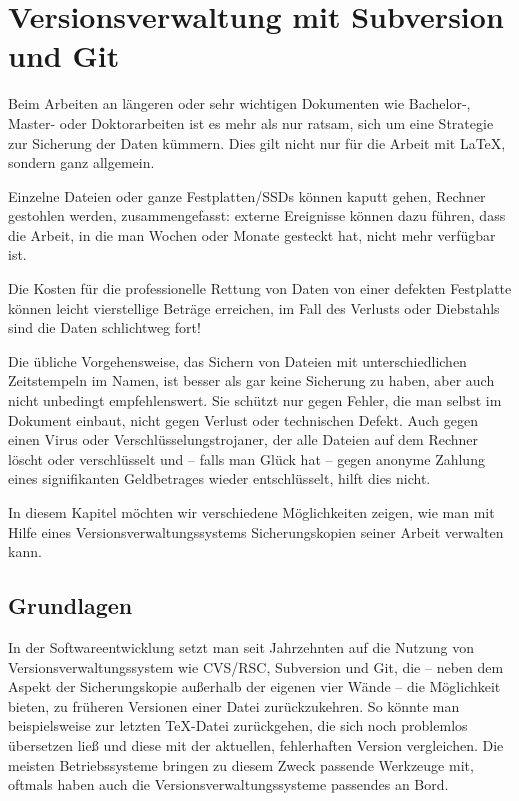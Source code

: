 \chapter{Versionsverwaltung mit Subversion und Git}

Beim Arbeiten an längeren oder sehr wichtigen Dokumenten wie Bachelor-, Master- oder Doktorarbeiten ist es mehr als nur ratsam, sich um eine Strategie zur Sicherung der Daten kümmern. Dies gilt nicht nur für die Arbeit mit \LaTeX, sondern ganz allgemein. 

Einzelne Dateien oder ganze Festplatten/SSDs können kaputt gehen, Rechner gestohlen werden, zusammengefasst: externe Ereignisse können dazu führen, dass die Arbeit, in die man Wochen oder Monate gesteckt hat, nicht mehr verfügbar ist. 

Die Kosten für die professionelle Rettung von Daten von einer defekten Festplatte können leicht vierstellige Beträge erreichen, im Fall des Verlusts oder Diebstahls sind die Daten schlichtweg fort!

Die übliche Vorgehensweise, das Sichern von Dateien mit unterschiedlichen Zeitstempeln im Namen, ist besser als gar keine Sicherung zu haben, aber auch nicht unbedingt empfehlenswert. Sie schützt nur gegen Fehler, die man selbst im Dokument einbaut, nicht gegen Verlust oder technischen Defekt. Auch gegen einen Virus oder Verschlüsselungstrojaner, der alle Dateien auf dem Rechner löscht oder verschlüsselt und -- falls man Glück hat -- gegen anonyme Zahlung eines signifikanten Geldbetrages wieder entschlüsselt, hilft dies nicht.

In diesem Kapitel möchten wir verschiedene Möglichkeiten zeigen, wie man mit Hilfe eines Versionsverwaltungssystems Sicherungskopien seiner Arbeit verwalten kann.

\section{Grundlagen}

In der Softwareentwicklung setzt man seit Jahrzehnten auf die Nutzung von Versionsverwaltungssystem wie CVS/RSC, Subversion und Git, die -- neben dem Aspekt der Sicherungskopie außerhalb der eigenen vier Wände -- die Möglichkeit bieten, zu früheren Versionen einer Datei zurückzukehren. So könnte man beispielsweise zur letzten \TeX-Datei zurückgehen, die sich noch problemlos übersetzen ließ und diese mit der aktuellen, fehlerhaften Version vergleichen. Die meisten Betriebssysteme bringen zu diesem Zweck passende Werkzeuge mit, oftmals haben auch die Versionsverwaltungssysteme passendes an Bord.

